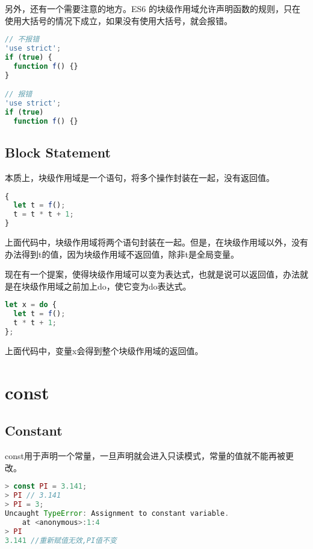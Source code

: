 另外，还有一个需要注意的地方。ES6 的块级作用域允许声明函数的规则，只在使用大括号的情况下成立，如果没有使用大括号，就会报错。



\begin{lstlisting}[language=JavaScript]
// 不报错
'use strict';
if (true) {
  function f() {}
}

// 报错
'use strict';
if (true)
  function f() {}
\end{lstlisting}

\subsection{Block Statement}

本质上，块级作用域是一个语句，将多个操作封装在一起，没有返回值。



\begin{lstlisting}[language=JavaScript]
{
  let t = f();
  t = t * t + 1;
}
\end{lstlisting}

上面代码中，块级作用域将两个语句封装在一起。但是，在块级作用域以外，没有办法得到t的值，因为块级作用域不返回值，除非t是全局变量。

现在有一个提案，使得块级作用域可以变为表达式，也就是说可以返回值，办法就是在块级作用域之前加上do，使它变为do表达式。

\begin{lstlisting}[language=JavaScript]
let x = do {
  let t = f();
  t * t + 1;
};
\end{lstlisting}

上面代码中，变量x会得到整个块级作用域的返回值。



\section{const}


\subsection{Constant}



const用于声明一个常量，一旦声明就会进入只读模式，常量的值就不能再被更改。


\begin{lstlisting}[language=JavaScript]
> const PI = 3.141;
> PI // 3.141
> PI = 3; 
Uncaught TypeError: Assignment to constant variable.
    at <anonymous>:1:4
> PI
3.141 //重新赋值无效,PI值不变
\end{lstlisting}

